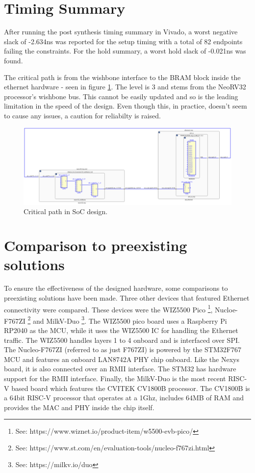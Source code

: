 \section{Timing Summary}
\label{sec:timing_summary}
After running the post synthesis timing summary in Vivado, a worst negative slack of -2.634ns was reported for the setup timing with a total of 82 endpoints failing the constraints. For the hold summary, a worst hold slack of -0.021ns was found. 

The critical path is from the wishbone interface to the BRAM block inside the ethernet hardware - seen in figure \ref{fig:crit_path}. The level is 3 and stems from the NeoRV32 processor's wishbone bus. This cannot be easily updated and so is the leading limitation in the speed of the design. Even though this, in practice, doesn't seem to cause any issues, a caution for reliabilty is raised. 

\begin{figure}[h]
    \centering
    \includegraphics[width=1\textwidth]{Images/critical_path_delay_schematic.png}
    \caption[Critical path in SoC design]{Critical path in SoC design.}
    \label{fig:crit_path}
\end{figure}





\section{Comparison to preexisting solutions}

To ensure the effectiveness of the designed hardware, some comparisons to preexisting solutions have been made. Three other devices that featured Ethernet connectivity were compared. These devices were the WIZ5500 Pico \footnote[1]{See: https://www.wiznet.io/product-item/w5500-evb-pico/}, Nucloe-F767ZI \footnote[2]{See: https://www.st.com/en/evaluation-tools/nucleo-f767zi.html} and MilkV-Duo \footnote[3]{See: https://milkv.io/duo}. The WIZ5500 pico board uses a Raspberry Pi RP2040 as the MCU, while it uses the WIZ5500 IC for handling the Ethernet traffic. The WIZ5500 handles layers 1 to 4 onboard and is interfaced over SPI. The Nucleo-F767ZI (referred to as just F767ZI) is powered by the STM32F767 MCU and features an onboard LAN8742A PHY chip onboard. Like the Nexys board, it is also connected over an RMII interface. The STM32 has hardware support for the RMII interface. Finally, the MilkV-Duo is the most recent RISC-V based board which features the CVITEK CV1800B processor. The CV1800B is a 64bit RISC-V processor that operates at a 1Ghz, includes 64MB of RAM and provides the MAC and PHY inside the chip itself.

